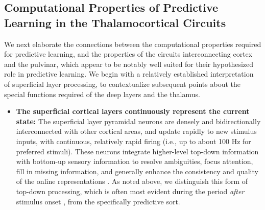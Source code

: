 \documentclass[11pt,twoside]{article}
\newif\myifpdf
\begin{document}
\subsection{Computational Properties of Predictive Learning in the Thalamocortical Circuits}

We next elaborate the connections between the computational properties required for predictive learning, and the properties of the circuits interconnecting cortex and the pulvinar, which appear to be notably well suited for their hypothesized role in predictive learning.  We begin with a relatively established interpretation of superficial layer processing, to contextualize subsequent points about the special functions required of the deep layers and the thalamus.
\begin{itemize}

	\item {\bf The superficial cortical layers continuously represent the current state:}  The superficial layer pyramidal neurons are densely and bidirectionally interconnected with other cortical areas, and update rapidly to new stimulus inputs, with continuous, relatively rapid firing (i.e., up to about 100 Hz for preferred stimuli).  These neurons integrate higher-level top-down information with bottom-up sensory information to resolve ambiguities, focus attention, fill in missing information, and generally enhance the consistency and quality of the online representations \citep{DesimoneDuncan95,ReynoldsChelazziDesimone99,MillerCohen01,OReillyWyatteHerdEtAl13,OReillyMunakataFrankEtAl12,OReillyHazyHerd16}. As noted above, we distinguish this form of top-down processing, which is often most evident during the period \emph{after} stimulus onset \citep{LeeMumford03}, from the specifically predictive sort.
	

\end{itemize}
\end{document}
